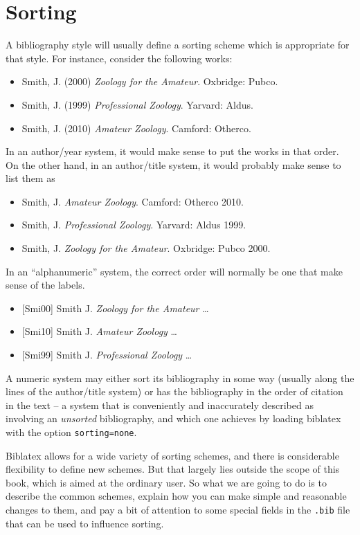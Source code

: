 \chapter{Sorting}

A bibliography style will usually define a sorting scheme which is
appropriate for that style. For instance, consider the following works:

\begin{itemize}
\item
  Smith, J. (2000) \emph{Zoology for the Amateur}. Oxbridge: Pubco.
\item
  Smith, J. (1999) \emph{Professional Zoology}. Yarvard: Aldus.
\item
  Smith, J. (2010) \emph{Amateur Zoology}. Camford: Otherco.
\end{itemize}

In an author/year system, it would make sense to put the works in that
order. On the other hand, in an author/title system, it would probably
make sense to list them as

\begin{itemize}
\item
  Smith, J. \emph{Amateur Zoology}. Camford: Otherco 2010.
\item
  Smith, J. \emph{Professional Zoology}. Yarvard: Aldus 1999.
\item
  Smith, J. \emph{Zoology for the Amateur}. Oxbridge: Pubco 2000.
\end{itemize}

In an ``alphanumeric'' system, the correct order will normally be one
that make sense of the labels.

\begin{itemize}
\item
  {[}Smi00{]} Smith J. \emph{Zoology for the Amateur} \ldots{}
\item
  {[}Smi10{]} Smith J. \emph{Amateur Zoology} \ldots{}
\item
  {[}Smi99{]} Smith J. \emph{Professional Zoology} \ldots{}
\end{itemize}

A numeric system may either sort its bibliography in some way (usually
along the lines of the author/title system) or has the bibliography in
the order of citation in the text -- a system that is conveniently and
inaccurately described as involving an \emph{unsorted} bibliography, and
which one achieves by loading biblatex with the option
\texttt{sorting=none}.

Biblatex allows for a wide variety of sorting schemes, and there is
considerable flexibility to define new schemes. But that largely lies
outside the scope of this book, which is aimed at the ordinary user. So
what we are going to do is to describe the common schemes, explain how
you can make simple and reasonable changes to them, and pay a bit of
attention to some special fields in the \texttt{.bib} file that can be
used to influence sorting.

